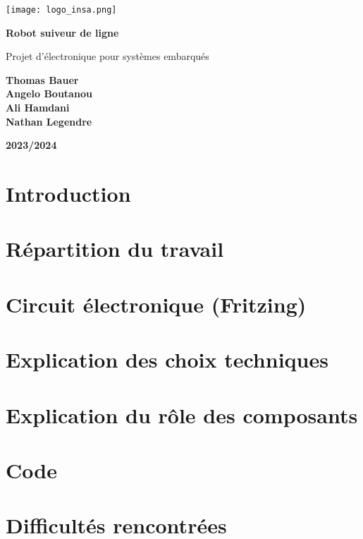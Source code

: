 \documentclass[12pt]{article}
\begin{document}
\begin{titlepage}
    \centering
    
    \texttt{[image: logo\_insa.png]}\par\vspace{1cm}
    
    {\LARGE\bfseries Robot suiveur de ligne\par}
    
    {\Large Projet d'électronique pour systèmes embarqués\par}
    
    \vspace{2cm}
    
    \vfill
    \begin{flushleft}
        \textbf{Thomas Bauer}\\
        \textbf{Angelo Boutanou}\\
        \textbf{Ali Hamdani}\\
        \textbf{Nathan Legendre}
    \end{flushleft}
        \vfill
    \begin{flushright}
        \textbf{2023/2024}
    \end{flushright}
    
\end{titlepage}

\newpage

\section*{Introduction}


\section{Répartition du travail}


\section{Circuit électronique (Fritzing)}

\section{Explication des choix techniques}


\section{Explication du rôle des composants}


\section{Code}

\section{Difficultés rencontrées}

\end{document}
